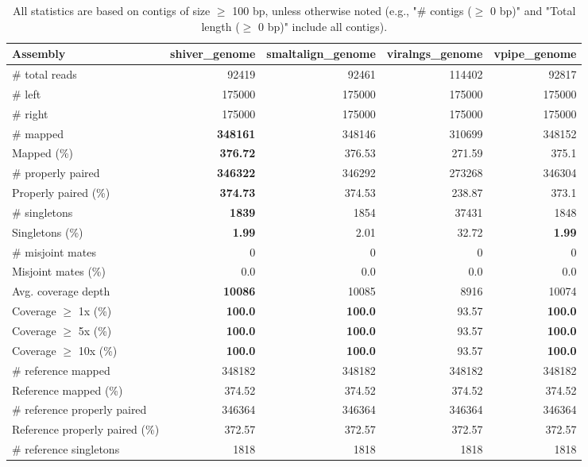 \documentclass[12pt,a4paper]{article}
\begin{document}
\begin{table}[ht]
\begin{center}
\caption{All statistics are based on contigs of size $\geq$ 100 bp, unless otherwise noted (e.g., "\# contigs ($\geq$ 0 bp)" and "Total length ($\geq$ 0 bp)" include all contigs).}
\begin{tabular}{|l*{4}{|r}|}
\hline
Assembly & shiver\_genome & smaltalign\_genome & viralngs\_genome & vpipe\_genome \\ \hline
\# total reads & 92419 & 92461 & 114402 & 92817 \\ \hline
\# left & 175000 & 175000 & 175000 & 175000 \\ \hline
\# right & 175000 & 175000 & 175000 & 175000 \\ \hline
\# mapped & {\bf 348161} & 348146 & 310699 & 348152 \\ \hline
Mapped (\%) & {\bf 376.72} & 376.53 & 271.59 & 375.1 \\ \hline
\# properly paired & {\bf 346322} & 346292 & 273268 & 346304 \\ \hline
Properly paired (\%) & {\bf 374.73} & 374.53 & 238.87 & 373.1 \\ \hline
\# singletons & {\bf 1839} & 1854 & 37431 & 1848 \\ \hline
Singletons (\%) & {\bf 1.99} & 2.01 & 32.72 & {\bf 1.99} \\ \hline
\# misjoint mates & 0 & 0 & 0 & 0 \\ \hline
Misjoint mates (\%) & 0.0 & 0.0 & 0.0 & 0.0 \\ \hline
Avg. coverage depth & {\bf 10086} & 10085 & 8916 & 10074 \\ \hline
Coverage $\geq$ 1x (\%) & {\bf 100.0} & {\bf 100.0} & 93.57 & {\bf 100.0} \\ \hline
Coverage $\geq$ 5x (\%) & {\bf 100.0} & {\bf 100.0} & 93.57 & {\bf 100.0} \\ \hline
Coverage $\geq$ 10x (\%) & {\bf 100.0} & {\bf 100.0} & 93.57 & {\bf 100.0} \\ \hline
\# reference mapped & 348182 & 348182 & 348182 & 348182 \\ \hline
Reference mapped (\%) & 374.52 & 374.52 & 374.52 & 374.52 \\ \hline
\# reference properly paired & 346364 & 346364 & 346364 & 346364 \\ \hline
Reference properly paired (\%) & 372.57 & 372.57 & 372.57 & 372.57 \\ \hline
\# reference singletons & 1818 & 1818 & 1818 & 1818 \\ \hline

\end{tabular}
\end{center}
\end{table}
\end{document}
